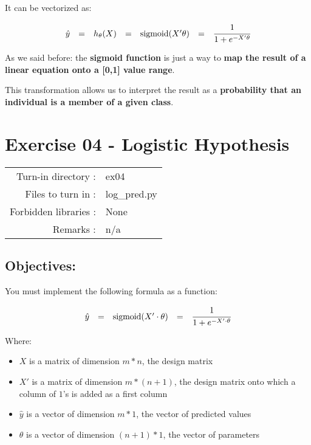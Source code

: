 \documentclass[]{article}
\begin{document}
It can be vectorized as:

\large

\[
\begin{matrix}
\hat{y} & = & h_\theta(X) & = & \text{sigmoid}(X'\theta) & =  &\cfrac{1} {1 + e^{-X'\theta}}    
\end{matrix}
\] \normalsize

As we said before: the \textbf{sigmoid function} is just a way to
\textbf{map the result of a linear equation onto a {[}0,1{]} value
range}.

This transformation allows us to interpret the result as a
\textbf{probability that an individual is a member of a given class}.
\clearpage

\hypertarget{exercise-04---logistic-hypothesis-1}{%
\section{Exercise 04 - Logistic
Hypothesis}\label{exercise-04---logistic-hypothesis-1}}

\begin{longtable}[]{@{}rl@{}}
\toprule
\endhead
Turn-in directory : & ex04\tabularnewline
Files to turn in : & log\_pred.py\tabularnewline
Forbidden libraries : & None\tabularnewline
Remarks : & n/a\tabularnewline
\bottomrule
\end{longtable}

\hypertarget{objectives-3}{%
\subsection{Objectives:}\label{objectives-3}}

You must implement the following formula as a function:

\large

\[
\begin{matrix}
\hat{y} & = & \text{sigmoid}(X' \cdot \theta) & = & \cfrac{1} {1 + e^{-X' \cdot \theta}}    
\end{matrix}
\] \normalsize

Where:

\begin{itemize}
\item
  \(X\) is a matrix of dimension \(m * n\), the design matrix
\item
  \(X'\) is a matrix of dimension \(m * (n + 1)\), the design matrix
  onto which a column of \(1\)'s is added as a first column
\item
  \(\hat{y}\) is a vector of dimension \(m * 1\), the vector of
  predicted values
\item
  \(\theta\) is a vector of dimension \((n + 1) * 1\), the vector of
  parameters
\end{itemize}
\end{document}
